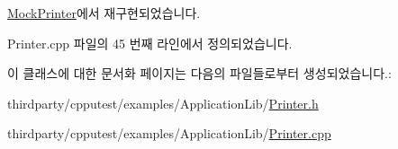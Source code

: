 \hyperlink{class_mock_printer_a5314eb94033e6305bb593e3927df427a}{Mock\+Printer}에서 재구현되었습니다.



Printer.\+cpp 파일의 45 번째 라인에서 정의되었습니다.




이 클래스에 대한 문서화 페이지는 다음의 파일들로부터 생성되었습니다.\+:\begin{DoxyCompactItemize}
\item 
thirdparty/cpputest/examples/\+Application\+Lib/\hyperlink{_printer_8h}{Printer.\+h}\item 
thirdparty/cpputest/examples/\+Application\+Lib/\hyperlink{_printer_8cpp}{Printer.\+cpp}\end{DoxyCompactItemize}
